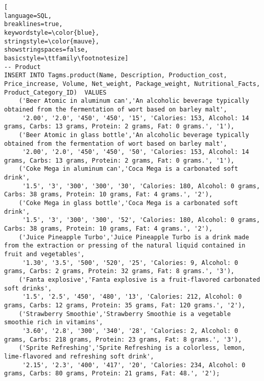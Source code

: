 \begin{lstlisting}[
language=SQL,
breaklines=true,
keywordstyle=\color{blue},
stringstyle=\color{mauve},
showstringspaces=false,
basicstyle=\ttfamily\footnotesize]
-- Product
INSERT INTO Tagms.product(Name, Description, Production_cost, Price_increase, Volume, Net_weight, Package_weight, Nutritional_Facts, Product_Category_ID)  VALUES
    ('Beer Atomic in aluminum can','An alcoholic beverage typically obtained from the fermentation of wort based on barley malt',
     '2.00', '2.0', '450', '450', '15', 'Calories: 153, Alcohol: 14 grams, Carbs: 13 grams, Protein: 2 grams, Fat: 0 grams.', '1'),
    ('Beer Atomic in glass bottle','An alcoholic beverage typically obtained from the fermentation of wort based on barley malt',
     '2.00', '2.0', '450', '450', '50', 'Calories: 153, Alcohol: 14 grams, Carbs: 13 grams, Protein: 2 grams, Fat: 0 grams.', '1'),
    ('Coke Mega in aluminum can','Coca Mega is a carbonated soft drink',
     '1.5', '3', '300', '300', '30', 'Calories: 180, Alcohol: 0 grams, Carbs: 38 grams, Protein: 10 grams, Fat: 4 grams.', '2'),
    ('Coke Mega in glass bottle','Coca Mega is a carbonated soft drink',
     '1.5', '3', '300', '300', '52', 'Calories: 180, Alcohol: 0 grams, Carbs: 38 grams, Protein: 10 grams, Fat: 4 grams.', '2'),
    ('Juice Pineapple Turbo','Juice Pineapple Turbo is a drink made from the extraction or pressing of the natural liquid contained in fruit and vegetables',
     '1.30', '3.5', '500', '520', '25', 'Calories: 9, Alcohol: 0 grams, Carbs: 2 grams, Protein: 32 grams, Fat: 8 grams.', '3'),
    ('Fanta explosive','Fanta explosive is a fruit-flavored carbonated soft drinks',
     '1.5', '2.5', '450', '480', '13', 'Calories: 212, Alcohol: 0 grams, Carbs: 12 grams, Protein: 35 grams, Fat: 120 grams.', '2'),
    ('Strawberry Smoothie','Strawberry Smoothie is a vegetable smoothie rich in vitamins',
     '3.60', '2.8', '300', '340', '28', 'Calories: 2, Alcohol: 0 grams, Carbs: 218 grams, Protein: 23 grams, Fat: 8 grams.', '3'),
    ('Sprite Refreshing','Sprite Refreshing is a colorless, lemon, lime-flavored and refreshing soft drink',
     '2.15', '2.3', '400', '417', '20', 'Calories: 234, Alcohol: 0 grams, Carbs: 80 grams, Protein: 21 grams, Fat: 48.', '2');



\end{lstlisting}
